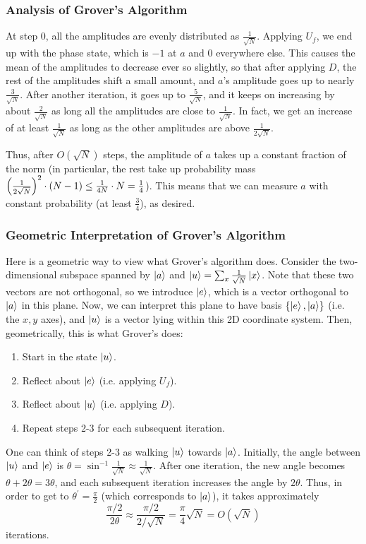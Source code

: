 \subsubsection{Analysis of Grover's Algorithm}

At step 0, all the amplitudes are evenly distributed as $\frac{1}{\sqrt{N}}$. Applying $U_f$, we end up with the phase state,
which is $-1$ at $a$ and 0 everywhere else. This causes the mean of the amplitudes to decrease ever so slightly, so that after applying $D$, the rest of the amplitudes shift a small amount, and $a$'s amplitude goes up to nearly $\frac{3}{\sqrt{N}}$.
After another iteration, it goes up to $\frac{5}{\sqrt{N}}$, and it keeps on increasing by about $\frac{2}{\sqrt{N}}$
as long all the amplitudes are close to $\frac{1}{\sqrt{N}}$. In fact, we get an increase of at least $\frac{1}{\sqrt{N}}$ as long as the other amplitudes are above $\frac{1}{2\sqrt{N}}$. 

Thus, after $O(\sqrt{N})$
steps, the amplitude of $a$ takes up a constant fraction of the norm (in particular, the rest take up 
probability mass $\qty(\frac{1}{2\sqrt{N}})^2 \cdot (N - 1) \leq \frac{1}{4N} \cdot N = \frac{1}{4}$).
This means that we can measure $a$ with constant probability (at least $\frac{3}{4}$), as desired.

\subsubsection{Geometric Interpretation of Grover's Algorithm}
Here is a geometric way to view what Grover's algorithm does. Consider the two-dimensional subspace spanned by
$\ket{a}$ and $\ket{u} = \sum_x \frac{1}{\sqrt{N}} \ket{x}$. Note that these two vectors are not orthogonal, so we introduce $\ket e$, which is a vector orthogonal to $\ket{a}$ in this plane. 
Now, we can interpret this plane to have basis $\{\ket e, \ket a\}$ (i.e. the $x, y$ axes), and $\ket u$ is a vector lying within this 2D coordinate system. Then, geometrically, this is what Grover's does:
\begin{enumerate}
    \item Start in the state $\ket u$.
    \item Reflect about $\ket e$ (i.e. applying $U_f$).
    \item Reflect about $\ket u$ (i.e. applying $D$).
    \item Repeat steps 2-3 for each subsequent iteration.
\end{enumerate}
One can think of steps 2-3 as walking $\ket{u}$ towards $\ket{a}$. Initially, the angle between $\ket{u}$ and $\ket{e}$ is $\theta = \sin^{-1} \frac{1}{\sqrt{N}} \approx \frac{1}{\sqrt{N}}$.
After one iteration, the new angle becomes $\theta + 2 \theta = 3 \theta$, and each subsequent iteration increases the angle by $2\theta$. Thus, in order to get to $\theta^{\prime} = \frac{\pi}{2}$ (which corresponds to $\ket a$), it takes approximately
\[\frac{\pi /2}{2 \theta} \approx \frac{\pi / 2}{2 / \sqrt{N}} = \frac{\pi}{4} \sqrt{N} = O(\sqrt{N})\]
iterations. 

